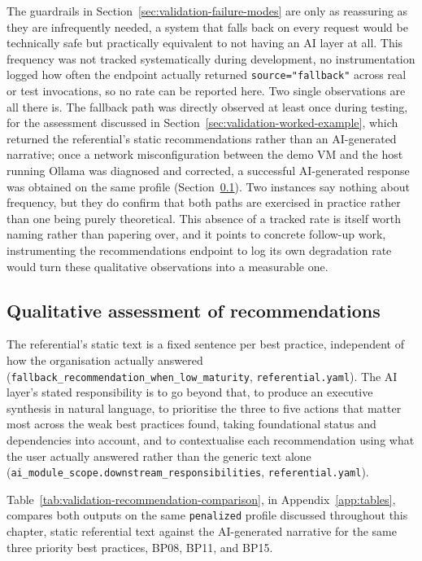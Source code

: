 The guardrails in Section~\ref{sec:validation-failure-modes} are only as
reassuring as they are infrequently needed, a system that falls back on
every request would be technically safe but practically equivalent to not
having an AI layer at all. This frequency was not tracked systematically
during development, no instrumentation logged how often the endpoint
actually returned \texttt{source="fallback"} across real or test
invocations, so no rate can be reported here. Two single observations are all
there is. The fallback path was directly observed at least once during testing,
for the assessment discussed in Section~\ref{sec:validation-worked-example},
which returned the referential's static recommendations rather than an
AI-generated narrative; once a network misconfiguration between the demo VM and
the host running Ollama was diagnosed and corrected, a successful AI-generated
response was obtained on the same profile
(Section~\ref{sec:validation-qualitative-ai}). Two instances say nothing about
frequency, but they do confirm that both paths are exercised in practice rather
than one being purely theoretical. This absence of a tracked rate is itself
worth naming rather than papering over, and it points to concrete follow-up
work, instrumenting the recommendations endpoint to log its own degradation
rate would turn these qualitative observations into a measurable one.

\subsection{Qualitative assessment of recommendations}
\label{sec:validation-qualitative-ai}

The referential's static text is a fixed sentence per best practice,
independent of how the organisation actually answered
(\texttt{fallback\_recommendation\_when\_low\_maturity},
\texttt{referential.yaml}). The AI layer's stated responsibility is to go
beyond that, to produce an executive synthesis in natural language, to
prioritise the three to five actions that matter most across the weak best
practices found, taking foundational status and dependencies into account,
and to contextualise each recommendation using what the user actually
answered rather than the generic text alone
(\texttt{ai\_module\_scope.downstream\_responsibilities},
\texttt{referential.yaml}).

Table~\ref{tab:validation-recommendation-comparison}, in Appendix~\ref{app:tables}, compares both outputs
on the same \texttt{penalized} profile discussed throughout this chapter,
static referential text against the AI-generated narrative for the same
three priority best practices, BP08, BP11, and BP15.



